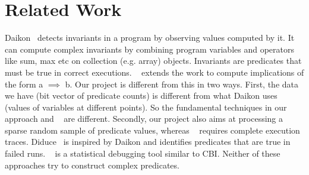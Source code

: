 
\section{Related Work}
\label{sec-rw}
Daikon~\cite{ErnstPGMPTX2006} detects invariants in a program by observing values computed by it.  It can compute complex invariants by combining program variables and operators like sum, max etc on collection (e.g. array) objects.  Invariants are predicates that must be true in correct executions.  ~\cite{ErnstDRAFT} extends the work to compute implications of the form a $\implies$ b.  Our project is different from this in two ways.  First, the data we have (bit vector of predicate counts) is different from what Daikon uses (values of variables at different points).  So the fundamental techniques in our approach and ~\cite{ErnstDRAFT} are different.  Secondly, our project also aims at processing a sparse random sample of predicate values, whereas ~\cite{ErnstPGMPTX2006} requires complete execution traces.  Diduce~\cite{581377} is inspired by Daikon and identifies predicates that are true in failed runs.  ~\cite{1081753} is a statistical debugging tool similar to CBI.  Neither of these approaches try to construct complex predicates.
